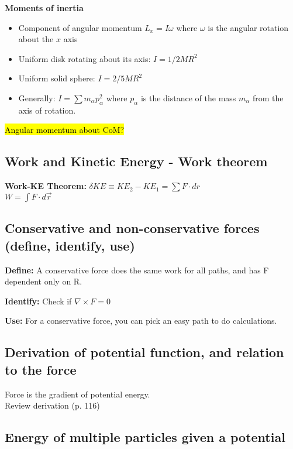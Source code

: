 \documentclass[a4paper, 11pt]{article}
\begin{document}
  \textbf{Moments of inertia}
  \begin{itemize}
    \item Component of angular momentum $L_x = I \omega$ where $\omega$ is the
    angular rotation about the $x$ axis
    \item Uniform disk rotating about its axis: $I = 1/2 M R^2$
    \item Uniform solid sphere: $I = 2/5 M R^2$
    \item Generally: $I = \sum m_\alpha p_\alpha^2$ where $p_\alpha$ is the distance
      of the mass $m_\alpha$ from the axis of rotation.

  \end{itemize}


  \hl{Angular momentum about CoM?}


  \subsection{Work and Kinetic Energy - Work theorem}

  \textbf{Work-KE Theorem: } $\delta KE \equiv KE_2 - KE_1 = \sum F \cdot dr$\\
  $ W = \int F \cdot d\vec{r}$


  \subsection{Conservative and non-conservative forces (define, identify, use)}

  \textbf{Define: } A conservative force does the same work for all paths,
  and has F dependent only on R.

  \textbf{Identify: } Check if $\nabla \times F = 0$

  \textbf{Use: } For a conservative force, you can pick an easy path to do calculations.


  \subsection{Derivation of potential function, and relation to the force}

  Force is the gradient of potential energy. \\
  Review derivation (p. 116)


  \subsection{Energy of multiple particles given a potential}
\end{document}
